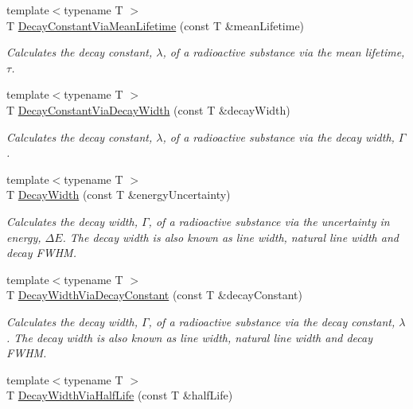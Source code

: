 \begin{DoxyCompactItemize}
{\footnotesize template$<$typename T $>$ }\\T \mbox{\hyperlink{group___e_g_x_phys-_decay_constant_ga260cf6dc4f926269ea8966c19dfd269f}{Decay\+Constant\+Via\+Mean\+Lifetime}} (const T \&mean\+Lifetime)
\begin{DoxyCompactList}\small\item\em Calculates the decay constant, $\lambda$, of a radioactive substance via the mean lifetime, $\tau$. \end{DoxyCompactList}\item 
{\footnotesize template$<$typename T $>$ }\\T \mbox{\hyperlink{group___e_g_x_phys-_decay_constant_gac0dc5d8a75657eaa2e939dd243fe4ba8}{Decay\+Constant\+Via\+Decay\+Width}} (const T \&decay\+Width)
\begin{DoxyCompactList}\small\item\em Calculates the decay constant, $\lambda$, of a radioactive substance via the decay width, $\Gamma$. \end{DoxyCompactList}\item 
{\footnotesize template$<$typename T $>$ }\\T \mbox{\hyperlink{group___e_g_x_phys-_decay_width_gae232ec8bb39710131be898c057a25620}{Decay\+Width}} (const T \&energy\+Uncertainty)
\begin{DoxyCompactList}\small\item\em Calculates the decay width, $\Gamma$, of a radioactive substance via the uncertainty in energy, $\Delta E$. The decay width is also known as line width, natural line width and decay F\+W\+HM. \end{DoxyCompactList}\item 
{\footnotesize template$<$typename T $>$ }\\T \mbox{\hyperlink{group___e_g_x_phys-_decay_width_ga143a666966efecc535a59bb4f36a79c6}{Decay\+Width\+Via\+Decay\+Constant}} (const T \&decay\+Constant)
\begin{DoxyCompactList}\small\item\em Calculates the decay width, $\Gamma$, of a radioactive substance via the decay constant, $\lambda$. The decay width is also known as line width, natural line width and decay F\+W\+HM. \end{DoxyCompactList}\item 
{\footnotesize template$<$typename T $>$ }\\T \mbox{\hyperlink{group___e_g_x_phys-_decay_width_ga1113224b24790a2e34032f9e90ad55c6}{Decay\+Width\+Via\+Half\+Life}} (const T \&half\+Life)

\end{DoxyCompactItemize}

